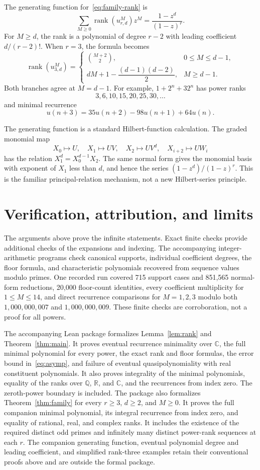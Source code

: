 \documentclass[11pt,a4paper]{article}
\newcommand{\rank}{\operatorname{rank}}
\newcommand{\CC}{\mathbb C}
\newcommand{\QQ}{\mathbb Q}
\begin{document}
The generating function for~\eqref{eq:family-rank} is
\[
 \sum_{M\ge0}\rank(u_{r,d}^M)z^M=\frac{1-z^d}{(1-z)^r}.
\]
For $M\ge d$, the rank is a polynomial of degree $r-2$ with leading coefficient
$d/(r-2)!$. When $r=3$, the formula becomes
\[
 \rank(u_{3,d}^M)=
 \begin{cases}
 \binom{M+2}{2},&0\le M\le d-1,\\[2pt]
 dM+1-\dfrac{(d-1)(d-2)}2,&M\ge d-1.
 \end{cases}
\]
Both branches agree at $M=d-1$. For example, $1+2^n+32^n$ has power ranks
\[
 3,6,10,15,20,25,30,\ldots
\]
and minimal recurrence
\[
 u(n+3)=35u(n+2)-98u(n+1)+64u(n).
\]

The generating function is a standard Hilbert-function calculation.
The graded monomial map
\[
 X_0\mapsto U,\quad X_1\mapsto UV,\quad X_2\mapsto UV^d,
 \quad X_{i+2}\mapsto UW_i
\]
has the relation $X_1^d=X_0^{d-1}X_2$.
The same normal form gives the monomial basis with exponent of $X_1$ less
than $d$, and hence the series $(1-z^d)/(1-z)^r$.
This is the familiar principal-relation mechanism, not a new Hilbert-series principle.

\section{Verification, attribution, and limits}\label{sec:verification}
The arguments above prove the infinite statements. Exact finite checks
provide additional checks of the expansions and indexing.
The accompanying integer-arithmetic programs check canonical supports,
individual coefficient degrees, the floor formula, and characteristic
polynomials recovered from sequence values modulo primes.
One recorded run covered 715 support cases and 851,565 normal-form reductions,
20,000 floor-count identities, every coefficient multiplicity for $1\le M\le14$,
and direct recurrence comparisons for $M=1,2,3$ modulo both
$1{,}000{,}000{,}007$ and $1{,}000{,}000{,}009$.
These finite checks are corroboration, not a proof for all powers.

The accompanying Lean package formalizes Lemma~\ref{lem:rank} and
Theorem~\ref{thm:main}. It proves eventual recurrence minimality over
$\CC$, the full minimal polynomial for every power, the exact rank and
floor formulas, the error bound in~\eqref{eq:asymp}, and failure of eventual
quasipolynomiality with real constituent polynomials. It also proves
integrality of the minimal polynomials, equality of the ranks over
$\QQ$, $\mathbb R$, and $\CC$, and the recurrences from index zero.
The zeroth-power boundary is included.
The package also formalizes Theorem~\ref{thm:family} for every $r\ge3$,
$d\ge2$, and $M\ge0$. It proves the full companion minimal polynomial,
its integral recurrence from index zero, and equality of rational, real,
and complex ranks. It includes the existence of the required distinct
odd primes and infinitely many distinct power-rank sequences at each $r$.
The companion generating function, eventual polynomial degree and leading
coefficient, and simplified rank-three examples retain their conventional
proofs above and are outside the formal package.
\end{document}
